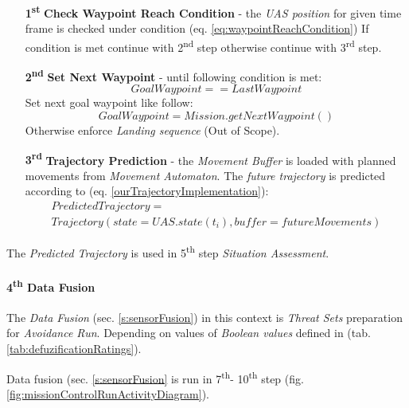 \begin{itemize}
    \item[\textbf{1\textsuperscript{st}}] \textbf{Check Waypoint Reach Condition} - the \emph{UAS position} for given time frame is checked under condition (eq. \ref{eq:waypointReachCondition})  If condition is met continue with 2\textsuperscript{nd} step otherwise continue with 3\textsuperscript{rd} step.

    \item[\textbf{2\textsuperscript{nd}}] \textbf{Set Next Waypoint} - until following condition is met:
    \begin{equation*}
        Goal Waypoint == Last Waypoint    
    \end{equation*}
    Set next goal waypoint like follow:
    \begin{equation*}
        Goal Waypoint = Mission.get Next Waypoint()
    \end{equation*}
    Otherwise enforce \emph{Landing sequence} (Out of Scope).
        
    \item[\textbf{3\textsuperscript{rd}}] \textbf{Trajectory Prediction} - the \emph{Movement Buffer} is loaded with planned movements from \emph{Movement Automaton}. The \emph{future trajectory} is predicted according to (eq. \ref{ourTrajectoryImplementation}):
    \begin{multline*}
        Predicted Trajectory = \\Trajectory(state=UAS.state(t_i),buffer=future Movements)
    \end{multline*}
\end{itemize}

\noindent The \emph{Predicted Trajectory} is used in 5\textsuperscript{th} step \emph{Situation Assessment}.

\paragraph{4\textsuperscript{th} Data Fusion} The \emph{Data Fusion} (sec. \ref{s:sensorFusion}) in this context is \emph{Threat Sets} preparation for \emph{Avoidance Run}. Depending on values of \emph{Boolean values} defined in (tab. \ref{tab:defuzificationRatings}).

\begin{note}
    Data fusion (sec. \ref{s:sensorFusion} is run in 7\textsuperscript{th}- 10\textsuperscript{th} step (fig. \ref{fig:missionControlRunActivityDiagram}). 
\end{note}

